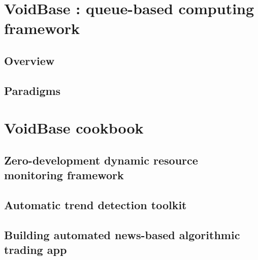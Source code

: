 \documentclass[]{book}    %
\begin{document}
\chapter{VoidBase : queue-based computing framework}
\section{Overview}
\section{Paradigms}

\chapter{VoidBase cookbook}
\section{Zero-development dynamic resource monitoring framework}
\section{Automatic trend detection toolkit}
\section{Building automated news-based algorithmic trading app}





\backmatter 
\end{document}
